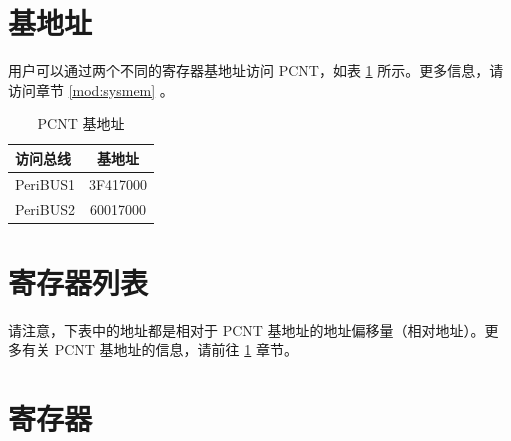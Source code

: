 \documentclass[main\_\_CN.tex]{subfiles}
\begin{document}
\section{基地址}\label{subsection:PCNT_base_address}
用户可以通过两个不同的寄存器基地址访问 PCNT，如表 \ref{table:PCNT_base_address} 所示。更多信息，请访问章节 \ref{mod:sysmem} \textit{}。

\begin{longtable}[c]{|l|c|}
\caption{PCNT 基地址}\label{table:PCNT_base_address}
\\\hline
\rowcolor{lightgray}
访问总线 & 基地址 \\
    \hline
PeriBUS1 & \hexprefix{}3F417000 \\
    \hline
PeriBUS2 & \hexprefix{}60017000 \\
    \hline
\end{longtable}

\hypertarget{pcnt-reg-summ}{}
\section{寄存器列表}

请注意，下表中的地址都是相对于 PCNT 基地址的地址偏移量（相对地址）。更多有关 PCNT 基地址的信息，请前往 \ref{subsection:PCNT_base_address} 章节。

\section{寄存器}

\end{document}
